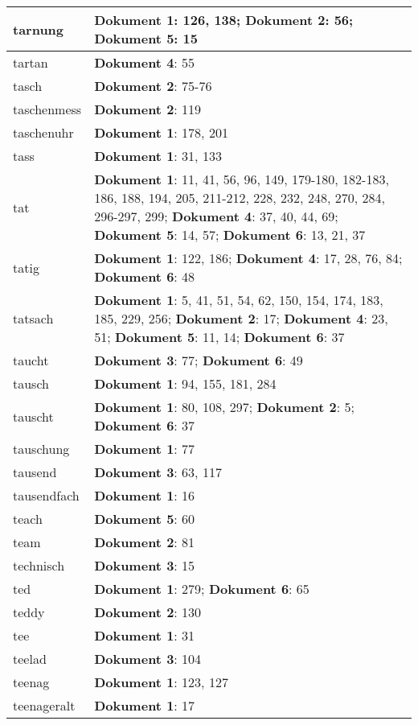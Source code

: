 \documentclass[a5paper]{article}
\begin{document}
\begin{longtable}[l]{|l|p{3in}|}
\hline
tarnung & \textbf{Dokument 1}: 126, 138; \textbf{Dokument 2}: 56; \textbf{Dokument 5}: 15 \\
\hline
tartan & \textbf{Dokument 4}: 55 \\
\hline
tasch & \textbf{Dokument 2}: 75-76 \\
\hline
taschenmess & \textbf{Dokument 2}: 119 \\
\hline
taschenuhr & \textbf{Dokument 1}: 178, 201 \\
\hline
tass & \textbf{Dokument 1}: 31, 133 \\
\hline
tat & \textbf{Dokument 1}: 11, 41, 56, 96, 149, 179-180, 182-183, 186, 188, 194, 205, 211-212, 228, 232, 248, 270, 284, 296-297, 299; \textbf{Dokument 4}: 37, 40, 44, 69; \textbf{Dokument 5}: 14, 57; \textbf{Dokument 6}: 13, 21, 37 \\
\hline
tatig & \textbf{Dokument 1}: 122, 186; \textbf{Dokument 4}: 17, 28, 76, 84; \textbf{Dokument 6}: 48 \\
\hline
tatsach & \textbf{Dokument 1}: 5, 41, 51, 54, 62, 150, 154, 174, 183, 185, 229, 256; \textbf{Dokument 2}: 17; \textbf{Dokument 4}: 23, 51; \textbf{Dokument 5}: 11, 14; \textbf{Dokument 6}: 37 \\
\hline
taucht & \textbf{Dokument 3}: 77; \textbf{Dokument 6}: 49 \\
\hline
tausch & \textbf{Dokument 1}: 94, 155, 181, 284 \\
\hline
tauscht & \textbf{Dokument 1}: 80, 108, 297; \textbf{Dokument 2}: 5; \textbf{Dokument 6}: 37 \\
\hline
tauschung & \textbf{Dokument 1}: 77 \\
\hline
tausend & \textbf{Dokument 3}: 63, 117 \\
\hline
tausendfach & \textbf{Dokument 1}: 16 \\
\hline
teach & \textbf{Dokument 5}: 60 \\
\hline
team & \textbf{Dokument 2}: 81 \\
\hline
technisch & \textbf{Dokument 3}: 15 \\
\hline
ted & \textbf{Dokument 1}: 279; \textbf{Dokument 6}: 65 \\
\hline
teddy & \textbf{Dokument 2}: 130 \\
\hline
tee & \textbf{Dokument 1}: 31 \\
\hline
teelad & \textbf{Dokument 3}: 104 \\
\hline
teenag & \textbf{Dokument 1}: 123, 127 \\
\hline
teenageralt & \textbf{Dokument 1}: 17 \\

\end{longtable}
\end{document}
